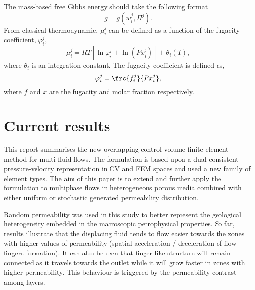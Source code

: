 \documentclass[12pt,a4paper,oneside]{report}%
\begin{document}
The mass-based free Gibbs energy should take the following format
\begin{displaymath}
g = g\left(w_{i}^{j},\Pi^{j}\right).
\end{displaymath}
From classical thermodynamic, $\mu_{i}^{j}$ can be defined as a function of the fugacity coefficient, $\varphi_{i}^{j}$,
\begin{equation}
\mu_{i}^{j}= R T\left[\ln\varphi_{i}^{j} + \ln\left(P x_{i}^{j}\right)\right] + \theta_{i}\left(T\right),
\end{equation}
where $\theta_{i}$ is an integration constant. The fugacity coefficient is defined as,
\begin{equation}
\varphi_{i}^{j} = \frc{f_{i}^{j}}{P x_{i}^{j}},
\end{equation}
where $f$ and $x$ are the fugacity and molar fraction respectively.

\chapter{Current results}

This report summarises the new overlapping control volume finite element method for multi-fluid flows. The formulation is based upon a dual consistent pressure-velocity representation in CV and FEM spaces and used a new family of element types. The aim of this paper is to extend and further apply the formulation \cite{Amanda2015} to multiphase flows in heterogeneous porous media combined with either uniform or stochastic generated permeability distribution. 

Random permeability was used in this study to better represent the geological heterogeneity embedded in the macroscopic petrophysical properties. So far, results illustrate that the displacing fluid tends to flow easier towards the zones with higher values of permeability (spatial acceleration / deceleration of flow – fingers formation). It can also be seen that finger-like structure will remain connected as it travels towards the outlet while it will grow faster in zones with higher permeability. This behaviour is triggered by the permeability contrast among layers.
\end{document}
